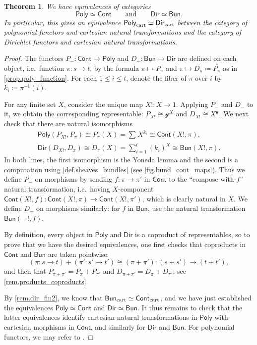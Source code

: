 \documentclass[11pt, article, one side]{memoir}
\theoremstyle{theorem}
\newtheorem{theorem}[section]{Theorem}
\theoremstyle{definition}
\theoremstyle{remark}
\newcommand{\Cat}[1]{\mathsf{#1}}%
\newcommand{\tn}[1]{\textnormal{#1}}
\newcommand{\inv}{^{-1}}
\newcommand{\cont}{\Cat{Cont}}
\newcommand{\bun}{\Cat{Bun}}
\newcommand{\yon}{\mathcal{y}}
\newcommand{\poly}{\Cat{Poly}}
\newcommand{\dir}{\Cat{Dir}}
\newcommand{\qqand}{\qquad\text{and}\qquad}
\begin{document}
\begin{theorem}\label{thm.equivs}
We have equivalences of categories
\[
\poly\simeq\cont
\qqand
\dir\simeq\bun.
\]
In particular, this gives an equivalence $\poly_{\tn{cart}} \simeq \dir_{\tn{cart}}$ between the category of polynomial functors and cartesian natural transformations and the category of Dirichlet functors and cartesian natural transformations.
\end{theorem}
\begin{proof}
The functors $P_-\colon\cont\to\poly$ and $D_-\colon\bun\to\dir$ are defined on each object, i.e.\ function $\pi\colon s\to t$, by the formula $\pi\mapsto P_\pi$ and $\pi\mapsto D_\pi\coloneqq\overline{P_\pi}$ as in \cref{prop.poly_function}. For each $1\leq i\leq t$, denote the fiber of $\pi$ over $i$ by $k_i\coloneqq\pi\inv(i)$.

For any finite set $X$, consider the unique map $X!\colon X\to 1$. Applying $P_-$ and $D_-$ to it, we obtain the corresponding representable: $P_{X!}\cong\yon^X$ and $D_{X!}\cong X^\yon$. We next check that there are natural isomorphisms
 \begin{gather}\nonumber
  \poly(P_{X!},P_\pi)\cong 
  P_\pi(X)=
  \sum_{}X^{k_i}\cong
  \cont(X!, \pi),
  \\\label{eqn.dir_bund}
  \dir(D_{X!}, D_\pi)\cong 
  D_\pi(X)=
  \sum_{i=1}^{t}(k_i)^X\cong
  \bun(X!, \pi).
\end{gather}
In both lines, the first isomorphism is the Yoneda lemma and the second is a computation using \cref{def.sheaves_bundles} (see \cref{fig.bund_cont_maps}). Thus we define $P_-$ on morphisms by sending $f\colon\pi\to\pi'$ in $\cont$ to the ``compose-with-$f$'' natural transformation, i.e.\ having $X$-component $\cont(X!,f)\colon\cont(X!,\pi)\to\cont(X!,\pi')$, which is clearly natural in $X$. We define $D_-$ on morphisms similarly: for $f$ in $\bun$, use the natural transformation $\bun(-!,f)$.

By definition, every object in $\poly$ and $\dir$ is a coproduct of representables, so to prove that we have the desired equivalences, one first checks that coproducts in $\cont$ and $\bun$ are taken pointwise:
\[
(\pi\colon s\to t)+(\pi'\colon s'\to t')\cong(\pi+\pi')\colon (s+s')\to (t+t'),
\]
and then that $P_{\pi+\pi'}=P_\pi+P_{\pi'}$ and $D_{\pi+\pi'}=D_\pi+D_{\pi'}$; see \cref{rem.products_coproducts}.

By \cref{rem.dir_fin2}, we know that $\bun_{\tn{cart}} \simeq \cont_{\tn{cart}}$, and we have just established the equivalences $\poly \simeq \cont$ and $\dir \simeq \bun$. It thus remains to check that the latter equivalences identify cartesian natural transformations in $\poly$ with cartesian morphisms in $\cont$, and similarly for $\dir$ and $\bun$. For polynomial functors, we may refer to \cite[Section 2]{kock2012polynomial}.


\end{proof}
\end{document}
